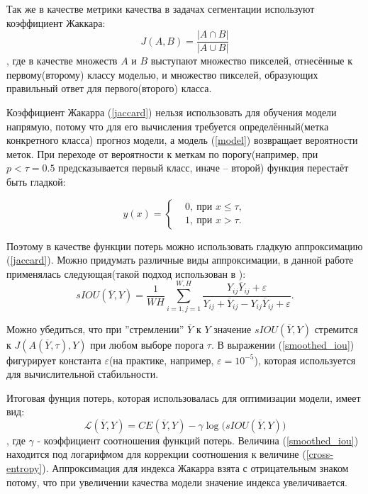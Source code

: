 \documentclass[12pt, a4paper]{extarticle}
\begin{document}
Так же в качестве метрики качества в задачах сегментации используют коэффициент Жаккара: 
\begin{equation} \label{jaccard}
	J(A, B) = \frac{|A \cap B|}{|A \cup B|} 
\end{equation}
, где в качестве множеств $A$ и $B$ выступают множество пикселей, отнесённые к 
первому(второму) классу моделью, и множество пикселей, образующих правильный ответ для первого(второго) класса.

Коэффициент Жакарра (\ref{jaccard}) нельзя использовать для обучения модели напрямую, потому что для его вычисления требуется определённый(метка конкретного класса) прогноз модели, а модель 
(\ref{model}) возвращает вероятности меток. При переходе от вероятности к меткам по порогу(например, при $p< \tau=0.5$ предсказывается первый класс, иначе -- второй) функция перестаёт быть гладкой:

\begin{equation} \label{threshold}
	y(x) = \begin{cases} 
		& 0 ,\ \text{при $x \leq \tau$}, \\	
		& 1 ,\ \text{при $x > \tau$}.
	\end{cases}
\end{equation}

Поэтому в качестве функции потерь можно использовать гладкую аппроксимацию (\ref{jaccard}). Можно придумать различные виды аппроксимации, в данной работе применялась следующая(такой подход использован в \cite{20}):
\begin{equation} \label{smoothed_iou}
	sIOU(\overline{Y}, Y) = \frac{1}{W H}
		\sum \limits_{i=1, j=1}^{W, H}
		\frac{Y_{ij} \overline{Y}_{ij} + \varepsilon}
		{Y_{ij} + \overline{Y}_{ij} 
			- Y_{ij} \overline{Y}_{ij} + \varepsilon}.
\end{equation} 
 
Можно убедиться, что при ''стремлении'' 
$\overline{Y}$ к $Y$ значение $sIOU(\overline{Y}, Y)$ стремится к $J(A(\overline{Y}, \tau), Y)$ при любом выборе порога $\tau$. В выражении (\ref{smoothed_iou}) фигурирует 
константа $\varepsilon$(на практике, например, $\varepsilon=10^{-5}$), которая используется для вычислительной стабильности.
 
Итоговая фунция потерь, которая использовалась для оптимизации модели, имеет вид:
\begin{equation} \label{final_loss}
	\mathcal{L}(\overline{Y}, Y) = CE(\overline{Y}, Y)
		- \gamma \log \bigl( sIOU(\overline{Y}, Y) \bigr)
\end{equation}
, где $\gamma$ - коэффициент соотношения функций потерь. Величина (\ref{smoothed_iou}) находится под логарифмом для коррекции соотношения к величине (\ref{cross-entropy}). Аппроксимация для индекса Жакарра взята с отрицательным знаком потому, что при увеличении качества модели значение индекса увеличивается.
\end{document}
